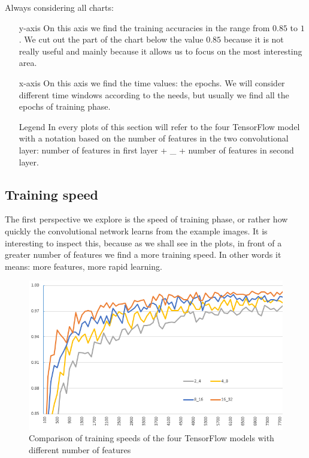 Always considering all charts:
\begin{itemize}
	\item[y-axis] On this axis we find the training accuracies in the range from $0.85$ to $1$. We cut out the part of the chart below the value $0.85$ because it is not really useful and mainly because it allows us to focus on the most interesting area.
	\item[x-axis] On this axis we find the time values: the epochs. We will consider different time windows according to the needs, but usually we find all the epochs of training phase.
	\item[Legend] In every plots of this section will refer to the four TensorFlow model with a notation based on the number of features in the two convolutional layer: number of features in first layer + \_ + number of features in second layer.
\end{itemize}

\subsection{Training speed}

The first perspective we explore is the speed of training phase, or rather how quickly the convolutional network learns from the example images. It is interesting to inspect this, because as we shall see in the plots, in front of a greater number of features we find a more training speed. In other words it means: more features, more rapid learning.

\begin{figure}
	\caption{Comparison of training speeds of the four TensorFlow models with different number of features}
	\label{fig:training_speed}
	\centering
	\includegraphics[width=1\textwidth]{Images/training_speed}
\end{figure}

